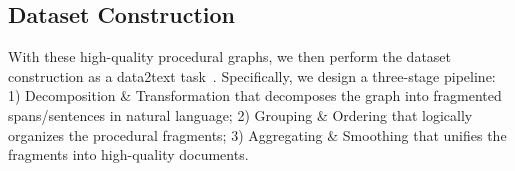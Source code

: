 \subsection{Dataset Construction}
With these high-quality procedural graphs, we then perform the dataset construction as a data2text task~\cite{lin2023survey}. Specifically, {we design a three-stage pipeline: 1) Decomposition \& Transformation that decomposes the graph into fragmented spans/sentences in natural language; 2) Grouping \& Ordering that logically organizes the procedural fragments; 3) Aggregating \& Smoothing that unifies the fragments into high-quality documents}. 







